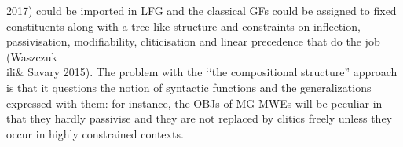 \documentclass[output=paper,
modfonts
]{langscibook}
\begin{document}
2017\ili{})\ili{} could\ili{} be\ili{} imported\ili{} in\ili{} LFG\ili{} and\ili{} the\ili{} classical\ili{} GFs\ili{} could\ili{} be\ili{} assigned\ili{} to\ili{} fixed\ili{} constituents\ili{} along\ili{} with\ili{} a\ili{} tree\ili{}-like\ili{} structure\ili{} and\ili{} constraints\ili{} on\ili{} inflection\ili{},\ili{} passivisation\ili{},\ili{} modifiability\ili{},\ili{} cliticisation\ili{} and\ili{} linear\ili{} precedence\ili{} that\ili{} do\ili{} the\ili{} job\ili{} \ili{}(Waszczuk\ili{} \ili{}\\ili{}&\ili{} Savary\ili{} 2015\ili{})\ili{}.\ili{} The\ili{} problem\ili{} with\ili{} the\ili{} \ili{} \ili{}`\ili{}`the\ili{} compositional\ili{} structure\ili{}”\ili{} approach\ili{} is\ili{} that\ili{} it\ili{} questions\ili{} the\ili{} notion\ili{} of\ili{} syntactic\ili{} functions\ili{} and\ili{} the\ili{} generalizations\ili{} expressed\ili{} with\ili{} them\ili{}:\ili{} for\ili{} instance\ili{},\ili{} the\ili{} OBJs\ili{} of\ili{} MG\ili{} MWEs\ili{} will\ili{} be\ili{} peculiar\ili{} in\ili{} that\ili{} they\ili{} hardly\ili{} passivise\ili{} and\ili{} they\ili{} are\ili{} not\ili{} replaced\ili{} by\ili{} clitics\ili{} freely\ili{} unless\ili{} they\ili{} occur\ili{} in\ili{} highly\ili{} constrained\ili{} contexts\ili{}.\ili{} \ili{}
\ili{}
\end{document}
